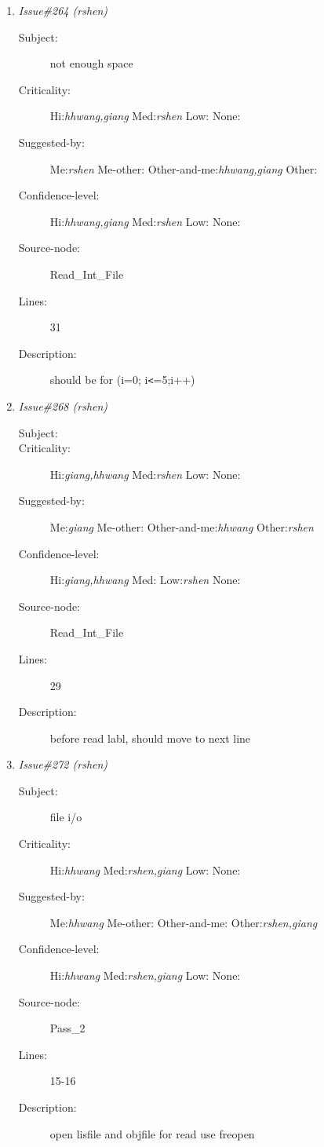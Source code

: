 \begin{enumerate}
\begin{description}
\item [Lines:] 11

\item [Description:] i is not initialized
\end{description}
\item {\it Issue\#264 (rshen)}
\begin{description}
\item [Subject:] not enough space
\item [Criticality:] Hi:{\it hhwang,giang} Med:{\it rshen} Low:{\it } None:{\it }
\item [Suggested-by:] Me:{\it rshen} Me-other:{\it } Other-and-me:{\it hhwang,giang} Other:{\it }
\item [Confidence-level:] Hi:{\it hhwang,giang} Med:{\it rshen} Low:{\it } None:{\it }
\item [Source-node:] Read\_Int\_File

\item [Lines:] 31

\item [Description:] should be for (i=0; i{\tt <}=5;i++)
\end{description}
\item {\it Issue\#268 (rshen)}
\begin{description}
\item [Subject:] 
\item [Criticality:] Hi:{\it giang,hhwang} Med:{\it rshen} Low:{\it } None:{\it }
\item [Suggested-by:] Me:{\it giang} Me-other:{\it } Other-and-me:{\it hhwang} Other:{\it rshen}
\item [Confidence-level:] Hi:{\it giang,hhwang} Med:{\it } Low:{\it rshen} None:{\it }
\item [Source-node:] Read\_Int\_File

\item [Lines:] 29

\item [Description:] before read labl, should move to next line
\end{description}
\item {\it Issue\#272 (rshen)}
\begin{description}
\item [Subject:] file i/o
\item [Criticality:] Hi:{\it hhwang} Med:{\it rshen,giang} Low:{\it } None:{\it }
\item [Suggested-by:] Me:{\it hhwang} Me-other:{\it } Other-and-me:{\it } Other:{\it rshen,giang}
\item [Confidence-level:] Hi:{\it hhwang} Med:{\it rshen,giang} Low:{\it } None:{\it }
\item [Source-node:] Pass\_2

\item [Lines:] 15-16

\item [Description:] open lisfile and objfile for read use freopen
\end{description}
\end{enumerate}
